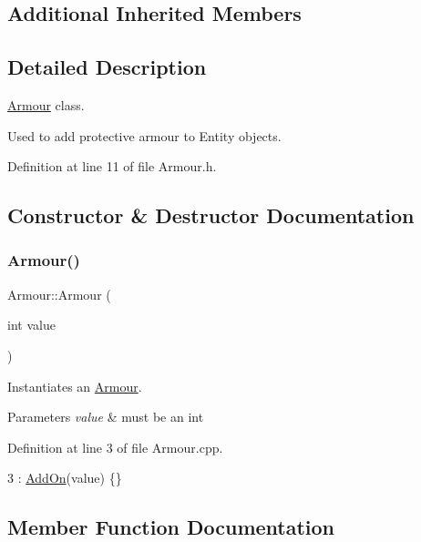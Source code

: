 \subsection*{Additional Inherited Members}


\subsection{Detailed Description}
\hyperlink{classArmour}{Armour} class. 

Used to add protective armour to Entity objects. 

Definition at line 11 of file Armour.\+h.



\subsection{Constructor \& Destructor Documentation}
\mbox{\label{classArmour_a5fe1e213870c5eab65baa54bb4a3ef02}} 
\subsubsection{\texorpdfstring{Armour()}{Armour()}}
{\footnotesize\ttfamily Armour\+::\+Armour (\begin{DoxyParamCaption}\item[{int}]{value }\end{DoxyParamCaption})}



Instantiates an \hyperlink{classArmour}{Armour}. 


\begin{DoxyParams}{Parameters}
{\em value} & must be an int \\
\hline
\end{DoxyParams}


Definition at line 3 of file Armour.\+cpp.


\begin{DoxyCode}
3 : \hyperlink{classAddOn_a64f23691b6c7fc49b6584f8f761ce4d9}{AddOn}(value) \{\}
\end{DoxyCode}


\subsection{Member Function Documentation}
\mbox{\label{classArmour_ab200b02561ecc30c20397913a2bc9511}} 
